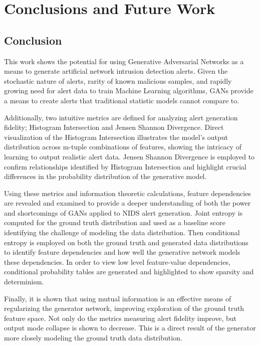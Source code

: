 \chapter{Conclusions and Future Work}

\section{Conclusion}

This work shows the potential for using Generative Adversarial Networks as a means to generate artificial network intrusion detection alerts. Given the stochastic nature of alerts, rarity of known malicious samples, and rapidly growing need for alert data to train Machine Learning algorithms, GANs provide a means to create alerts that traditional statistic models cannot compare to.  

Additionally, two intuitive metrics are defined for analyzing alert generation fidelity; Histogram Intersection and Jensen Shannon Divergence. Direct visualization of the Histogram Intersection illustrates the model's output distribution across m-tuple combinations of features, showing the intricacy of learning to output realistic alert data. Jensen Shannon Divergence is employed to confirm relationships identified by Histogram Intersection and highlight crucial differences in the probability distribution of the generative model.

Using these metrics and information theoretic calculations, feature dependencies are revealed and examined to provide a deeper understanding of both the power and shortcomings of GANs applied to NIDS alert generation. Joint entropy is computed for the ground truth distribution and used as a baseline score identifying the challenge of modeling the data distribution. Then conditional entropy is employed on both the ground truth and generated data distributions to identify feature dependencies and how well the generative network models these dependencies. In order to view low level feature-value dependencies, conditional probability tables are generated and highlighted to show sparsity and determinism. 

Finally, it is shown that using mutual information is an effective means of regularizing the generator network, improving exploration of the ground truth feature space. Not only do the metrics measuring alert fidelity improve, but output mode collapse is shown to decrease. This is a direct result of the generator more closely modeling the ground truth data distribution. 

